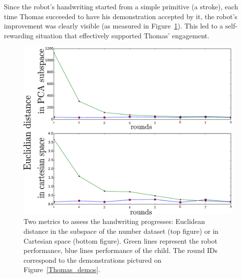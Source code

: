 \documentclass{sig-alternate}
\begin{document}
Since the robot's handwriting started from a simple primitive (a stroke), each
time Thomas succeeded to have his demonstration accepted by it, the robot's
improvement was clearly visible (as measured in Figure~\ref{Thomas_distances}).
This led to a self-rewarding situation that effectively supported Thomas'
engagement.

\begin{figure}
    \centering
    \includegraphics[width=0.9\linewidth]{learning_6_distances}
    \caption{\small Two metrics to assess the handwriting progresses: Euclidean
    distance in the subspace of the number dataset (top figure) or in
Cartesian space (bottom figure). Green lines represent the robot performance,
blue lines performance of the child. The round IDs correspond to the demonstrations
pictured on Figure~\ref{Thomas_demos}.}
    \label{Thomas_distances}
\end{figure}

\end{document}
